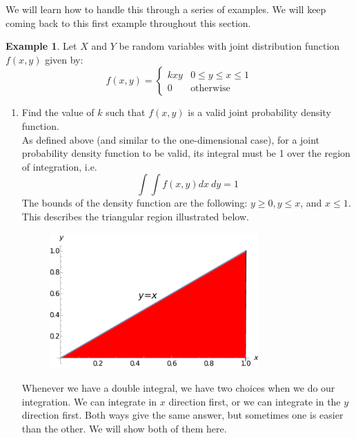 \documentclass[12pt]{article}
\theoremstyle{definition}
\newtheorem*{example}{Example}
\theoremstyle{remark}
\begin{document}
We will learn how to handle this through a series of examples. We will keep coming back to this first example throughout this section.

\begin{example}Let $X$ and $Y$ be random variables with joint distribution function $f(x, y)$ given by:
\[
f(x, y) = \begin{cases} 
      k x y  & 0 \leq y \leq x \leq 1 \\
      0 & \textrm{otherwise}
   \end{cases}
\]

\begin{enumerate}
\item Find the value of $k$ such that $f(x, y)$ is a valid joint probability density function. \\

As defined above (and similar to the one-dimensional case), for a joint probability density function to be valid, its integral must be 1 over the region of integration, i.e.
\[
\int \int f(x, y) dx \: dy = 1
\]
The bounds of the density function are the following: $y \geq 0, y \leq x$, and $x \leq 1$. This describes the triangular region illustrated below.

\begin{figure}[H]
\centering
\includegraphics[width=8cm]{region1}
\end{figure}

Whenever we have a double integral, we have two choices when we do our integration. We can integrate in $x$ direction first, or we can integrate in the $y$ direction first. Both ways give the same answer, but sometimes one is easier than the other. We will show both of them here. \\


\end{enumerate}
\end{example}
\end{document}

